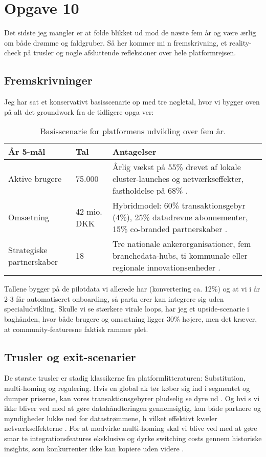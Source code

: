 \section*{Opgave 10}

Det sidste jeg mangler er at folde blikket ud mod de næste fem år og være ærlig om både drømme og faldgruber. Så her kommer mi
n fremskrivning, et reality-check på trusler og nogle afsluttende refleksioner over hele platformrejsen.

\subsection*{Fremskrivninger}
Jeg har sat et konservativt basisscenarie op med tre nøgletal, hvor vi bygger oven på alt det groundwork fra de tidligere opga
ver:\newline
\begin{table}[h]
  \centering
  \begin{tabular}{p{3cm}p{3.5cm}p{6cm}}
    \toprule
    \textbf{År 5-mål} & \textbf{Tal} & \textbf{Antagelser} \\
    \midrule
    Aktive brugere & 75.000 & Årlig vækst på 55\% drevet af lokale cluster-launches og netværkseffekter, fastholdelse på 68\% \citep{Choudary2016,Srnicek2017}. \\
    Omsætning & 42 mio. DKK & Hybridmodel: 60\% transaktionsgebyr (4\%), 25\% datadrevne abonnementer, 15\% co-branded partnerskaber \citep{ShapiroVarian1999}. \\
    Strategiske partnerskaber & 18 & Tre nationale ankerorganisationer, fem branchedata-hubs, ti kommunale eller regionale innovationsenheder \citep{Reillier2017}. \\
    \bottomrule
  \end{tabular}
  \caption{Basisscenarie for platformens udvikling over fem år.}
\end{table}

Tallene bygger på de pilotdata vi allerede har (konvertering ca. 12\%) og at vi i år 2-3 får automatiseret onboarding, så partn
erer kan integrere sig uden specialudvikling. Skulle vi se stærkere virale loops, har jeg et upside-scenarie i baghånden, hvor
 både brugere og omsætning ligger 30\% højere, men det kræver, at community-featuresne faktisk rammer plet.

\subsection*{Trusler og exit-scenarier}
De største trusler er stadig klassikerne fra platformlitteraturen: Substitution, multi-homing og regulering. Hvis en global ak
tør køber sig ind i segmentet og dumper priserne, kan vores transaktionsgebyrer pludselig se dyre ud \citep{Porter2008}. Og hvi
s vi ikke bliver ved med at gøre datahåndteringen gennemsigtig, kan både partnere og myndigheder lukke ned for datastrømmene, h
vilket effektivt kvæler netværkseffekterne \citep{Srnicek2017}. For at modvirke multi-homing skal vi blive ved med at gøre smar
te integrationsfeatures eksklusive og dyrke switching costs gennem historiske insights, som konkurrenter ikke kan kopiere uden
 videre \citep{FarrellSaloner1986}.

